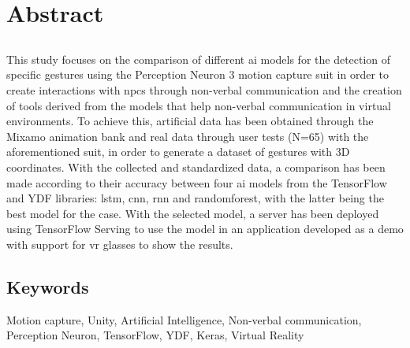 \chapter*{Abstract}

\section*{\tituloPortadaEngVal}
This study focuses on the comparison of different \gls{ai} models for the detection of specific gestures using the Perception Neuron 3 motion capture suit in order to create interactions with \glspl{npc} through non-verbal communication and the creation of tools derived from the models that help non-verbal communication in virtual environments.
To achieve this, artificial data has been obtained through the Mixamo animation bank and real data through user tests (N=65) with the aforementioned suit, in order to generate a dataset of gestures with 3D coordinates.
With the collected and standardized data, a comparison has been made according to their accuracy between four \gls{ai} models from the TensorFlow and YDF libraries: \gls{lstm}, \gls{cnn}, \gls{rnn} and \gls{randomforest}, with the latter being the best model for the case.
With the selected model, a server has been deployed using TensorFlow Serving to use the model in an application developed as a demo with support for \gls{vr} glasses to show the results.

\section*{Keywords}

\noindent Motion capture, Unity, Artificial Intelligence, Non-verbal communication, Perception Neuron, TensorFlow, YDF, Keras, Virtual Reality



